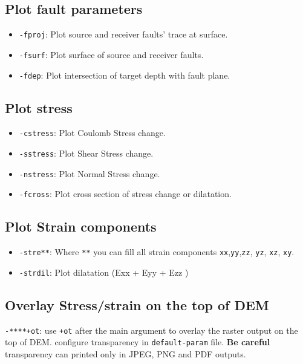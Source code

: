 \subsection{Plot fault parameters}\label{plot-fault-parameters}

\begin{itemize}
\item
  \texttt{-fproj}: Plot source and receiver faults' trace at surface.
\item
  \texttt{-fsurf}: Plot surface of source and receiver faults.
\item
  \texttt{-fdep}: Plot intersection of target depth with fault plane.
\end{itemize}

\subsection{Plot stress}\label{plot-stress}

\begin{itemize}
\item
  \texttt{-cstress}: Plot Coulomb Stress change.
\item
  \texttt{-sstress}: Plot Shear Stress change.
\item
  \texttt{-nstress}: Plot Normal Stress change.
\item
  \texttt{-fcross}: Plot cross section of stress change or dilatation.
\end{itemize}

\subsection{Plot Strain components}\label{plot-strain-components}

\begin{itemize}
\item
  \texttt{-stre**}: Where \texttt{**} you can fill all strain components
  \texttt{xx},\texttt{yy},\texttt{zz}, \texttt{yz}, \texttt{xz},
  \texttt{xy}.
\item
  \texttt{-strdil}: Plot dilatation (Exx + Eyy + Ezz )
\end{itemize}

\subsection{Overlay Stress/strain on the top of DEM}

\texttt{-****+ot}: use \texttt{+ot} after the main argument to overlay
the raster output on the top of DEM. configure transparency in
\texttt{default-param} file. \textbf{Be careful} transparency can
printed only in JPEG, PNG and PDF outputs.

